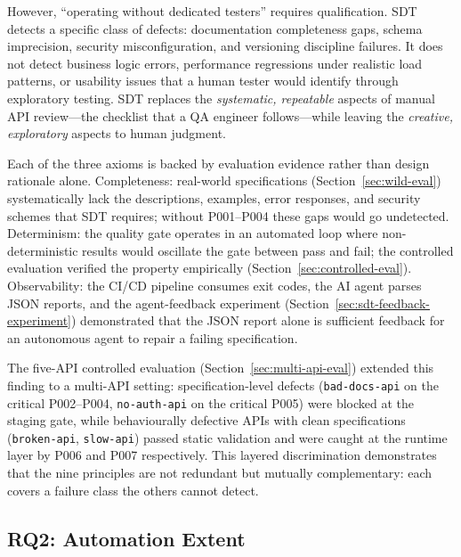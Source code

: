 However, ``operating without dedicated testers'' requires qualification. SDT detects a specific class of defects: documentation completeness gaps, schema imprecision, security misconfiguration, and versioning discipline failures. It does not detect business logic errors, performance regressions under realistic load patterns, or usability issues that a human tester would identify through exploratory testing. SDT replaces the \textit{systematic, repeatable} aspects of manual API review---the checklist that a QA engineer follows---while leaving the \textit{creative, exploratory} aspects to human judgment.

Each of the three axioms is backed by evaluation evidence rather than design rationale alone. Completeness: real-world specifications (Section~\ref{sec:wild-eval}) systematically lack the descriptions, examples, error responses, and security schemes that SDT requires; without P001--P004 these gaps would go undetected. Determinism: the quality gate operates in an automated loop where non-deterministic results would oscillate the gate between pass and fail; the controlled evaluation verified the property empirically (Section~\ref{sec:controlled-eval}). Observability: the CI/CD pipeline consumes exit codes, the AI agent parses JSON reports, and the agent-feedback experiment (Section~\ref{sec:sdt-feedback-experiment}) demonstrated that the JSON report alone is sufficient feedback for an autonomous agent to repair a failing specification.

The five-API controlled evaluation (Section~\ref{sec:multi-api-eval}) extended this finding to a multi-API setting: specification-level defects (\texttt{bad-docs-api} on the critical P002--P004, \texttt{no-auth-api} on the critical P005) were blocked at the staging gate, while behaviourally defective APIs with clean specifications (\texttt{broken-api}, \texttt{slow-api}) passed static validation and were caught at the runtime layer by P006 and P007 respectively. This layered discrimination demonstrates that the nine principles are not redundant but mutually complementary: each covers a failure class the others cannot detect.

\subsection{RQ2: Automation Extent}
\label{subsec:discuss-rq2}

